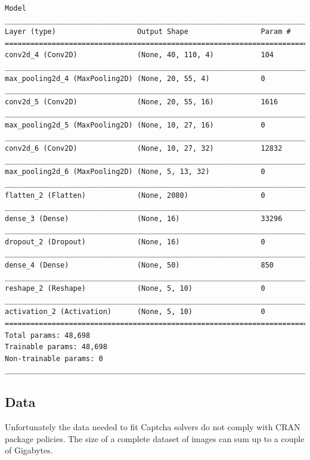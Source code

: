 \documentclass[article,nojss]{jss}
\begin{document}
\begin{verbatim}
Model
_______________________________________________________________________
Layer (type)                   Output Shape                 Param #    
=======================================================================
conv2d_4 (Conv2D)              (None, 40, 110, 4)           104        
_______________________________________________________________________
max_pooling2d_4 (MaxPooling2D) (None, 20, 55, 4)            0          
_______________________________________________________________________
conv2d_5 (Conv2D)              (None, 20, 55, 16)           1616       
_______________________________________________________________________
max_pooling2d_5 (MaxPooling2D) (None, 10, 27, 16)           0          
_______________________________________________________________________
conv2d_6 (Conv2D)              (None, 10, 27, 32)           12832      
_______________________________________________________________________
max_pooling2d_6 (MaxPooling2D) (None, 5, 13, 32)            0          
_______________________________________________________________________
flatten_2 (Flatten)            (None, 2080)                 0          
_______________________________________________________________________
dense_3 (Dense)                (None, 16)                   33296      
_______________________________________________________________________
dropout_2 (Dropout)            (None, 16)                   0          
_______________________________________________________________________
dense_4 (Dense)                (None, 50)                   850        
_______________________________________________________________________
reshape_2 (Reshape)            (None, 5, 10)                0          
_______________________________________________________________________
activation_2 (Activation)      (None, 5, 10)                0          
=======================================================================
Total params: 48,698
Trainable params: 48,698
Non-trainable params: 0
_______________________________________________________________________
\end{verbatim}

\hypertarget{data}{%
\subsection{Data}\label{data}}

Unfortunately the data needed to fit Captcha solvers do not comply with
CRAN package policies. The size of a complete dataset of images can sum
up to a couple of Gigabytes.
\end{document}
